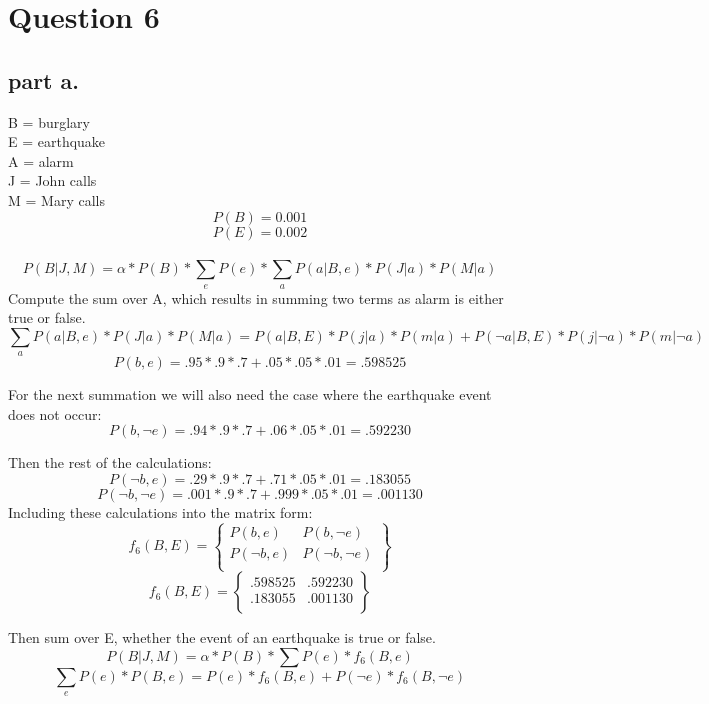 \section{Question 6}

\subsection{part a.}
B = burglary \\
E = earthquake \\
A = alarm \\
J = John calls \\
M = Mary calls \\
\[P(B) = 0.001 \]
\[P(E) = 0.002\] \\
\[P(B | J,M) = \alpha * P(B) * \sum_e{P(e) * \sum_a{P(a|B,e) * P(J|a) * P(M|a)}}
\]
Compute the sum over A, which results in summing two terms as alarm is either true or false.
\[\sum_{a}{P(a|B,e) * P(J|a) * P(M|a)} =
P(a|B,E)*P(j|a) * P(m|a) + P(\neg a|B,E) * P(j|\neg a)*P(m|\neg a)
\]
\[P(b, e) = .95 * .9 * .7 + .05 * .05 * .01 = .598525
\]

For the next summation we will also need the case where the earthquake event does not occur:
\[P(b,\neg e) = .94 * .9 * .7 + .06 * .05 * .01 = .592230
\]

Then the rest of the calculations:
\[P(\neg b, e) = .29 * .9 * .7 + .71 * .05 * .01 = .183055
\]
\[P(\neg b,\neg e) = .001 * .9 * .7 + .999 * .05 * .01 = .001130
\]
Including these calculations into the matrix form:
\[
f_6(B,E) = \begin{Bmatrix}
P(b,e) & P(b, \neg e) \\
P(\neg b, e) & P(\neg b, \neg e) \\
\end{Bmatrix}
\]
\[
f_6(B,E) = \begin{Bmatrix}
.598525 & .592230 \\
.183055 & .001130 \\
\end{Bmatrix}
\]

Then sum over E, whether the event of an earthquake is true or false.
\[ P(B | J, M) = \alpha * P(B) * \sum{P(e) * f_6(B,e)}
\]
\[
\sum_e{P(e) * P(B,e)} = P(e)* f_6(B,e) + P(\neg e) * f_6(B, \neg e)
\]

